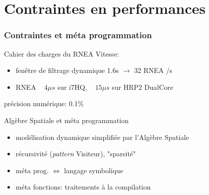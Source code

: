 \documentclass[10pt]{beamer}
\begin{document}
\section{Contraintes en performances}

\begin{frame}
  \frametitle{Contraintes et méta programmation}

	\begin{block}{Cahier des charges du RNEA}
	Vitesse:
	\begin{itemize}
	\item fenêtre de filtrage dynamique 1.6s $\longrightarrow$ 32 RNEA /s
	\item  RNEA ~ $4\mu s$ sur i7HQ, ~ $15\mu s$ sur HRP2 DualCore 
	\end{itemize}
	
	précision numérique: 0.1\%
	\end{block}
	
  \begin{block}{Algèbre Spatiale et méta programmation}
  
  \begin{itemize}
  \item modélisation dynamique simplifiée par l'Algèbre Spatiale \\
  \item récursivité (\emph{pattern} Visiteur), "sparsité" 
  \item méta prog. $\iff$ langage symbolique 
  \item méta fonctions: traitements à la compilation \\
  \end{itemize}
	\end{block}
  
\end{frame}
\end{document}
